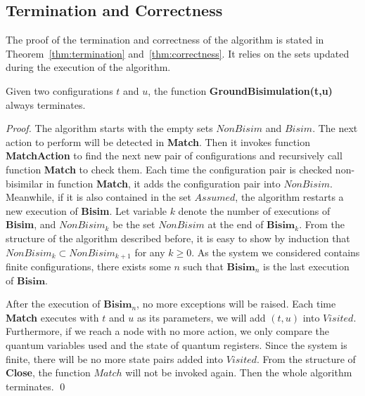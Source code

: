 \documentclass[runningheads]{llncs}
\begin{document}
\subsection{Termination and Correctness}
\label{sec:properties}
The proof of the termination and correctness of the algorithm is stated in Theorem~\ref{thm:termination} and~\ref{thm:correctness}. It relies on the sets updated during the execution of the algorithm. 

\begin{theorem}[Termination]\label{thm:termination}
Given two configurations $t$ and $u$, the function \textbf{GroundBisimulation(t,u)} always terminates.
\end{theorem}
\begin{proof}
The algorithm starts with the empty sets $NonBisim$ and $Bisim$. The next action to perform will be detected in \textbf{Match}. Then it invokes function \textbf{MatchAction} to find the next new pair of configurations and recursively call function \textbf{Match} to check them. Each time the configuration pair is checked non-bisimilar in function \textbf{Match}, it adds the configuration pair into $NonBisim$. Meanwhile, if it is also contained in the set $Assumed$, the algorithm restarts a new execution of \textbf{Bisim}. Let variable $k$ denote the number of executions of \textbf{Bisim}, and $NonBisim_{k}$ be the set $NonBisim$ at the end of $\textbf{Bisim}_{k}$. From the structure of the algorithm described before, it is easy to show by induction that $NonBisim_{k}\subset NonBisim_{k+1}$ for any $k\geq 0$. As the system we considered contains finite configurations, there exists some $n$ such that $\textbf{Bisim}_{n}$ is the last execution of $\textbf{Bisim}$.

After the execution of $\textbf{Bisim}_{n}$, no more exceptions will be raised. Each time \textbf{Match} executes with $t$ and $u$ as its parameters, we will add $(t,u)$ into $Visited$. Furthermore, if we reach a node with no more action, we only compare the quantum variables used and the state of quantum registers. Since the system is finite, there will be no more state pairs added into $Visited$. From the structure of \textbf{Close}, the function $Match$ will not be invoked again. Then the whole algorithm terminates.
\qed
\end{proof}
\end{document}
